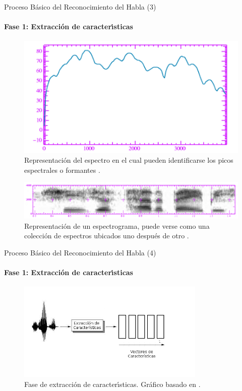 \begin{frame}{Proceso B\'asico del Reconocimiento del Habla (3)}
\framesubtitle{Fase 1: Extracci\'on de caracter{\'\i}sticas}
\begin{figure}[H]
\centering
\includegraphics[width=0.4\linewidth]{./graphics/formants.png}
\caption{Representaci\'on del espectro en el cual pueden identificarse los picos espectrales o formantes 
\cite{Jurafsky}.}
\label{figure:formants}
\end{figure}


\begin{figure}[H]
\centering
\includegraphics[width=0.7\linewidth]{./graphics/spectrogram.png}
\caption{Representaci\'on de un espectrograma, puede verse como una colecci\'on de espectros  ubicados uno despu\'es de otro \cite{Jurafsky}.}
\label{figure:spectrogram}
\end{figure}

\end{frame}

\begin{frame}{Proceso B\'asico del Reconocimiento del Habla (4)}
\framesubtitle{Fase 1: Extracci\'on de caracter{\'\i}sticas}

\begin{figure}[H] 
\centering
\includegraphics[width=0.8\textwidth]{./graphics/extraccion.png}
\caption{Fase de extracci\'on de caracter{\'\i}sticas. Gr\'afico basado en \cite{VerenichASR}.}
\label{figure:hmm}
\end{figure}
\end{frame}


